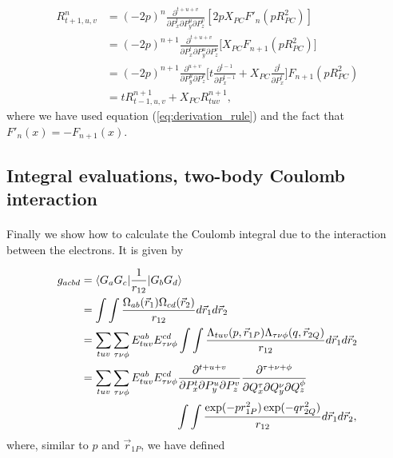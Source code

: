 \documentclass[%
twoside,                 %
final,                   %
10pt]{article}
\begin{document}
\begin{align}
 R^{n}_{t+1,u,v} & = (-2p)^n\frac{\partial^{t+u+v}}{\partial P_x^t \partial P_y^u \partial P_z^v} [2pX_{PC}F'_n(pR_{PC}^2)] \\
                 & = (-2p)^{n+1}\frac{\partial^{t+u+v}}{\partial P_x^t\partial P_y^u \partial P_z^v}\Big[X_{PC}F_{n+1}(pR_{PC}^2)\Big] \\
                 & = (-2p)^{n+1}\frac{\partial^{u+v}}{\partial P_y^u \partial P_z^v}\Big[t\frac{\partial^{t-1}}{\partial P_x^{t-1}} + X_{PC}\frac{\partial^t}{\partial P_x^t}\Big]F_{n+1}(pR_{PC}^2) \\
                 & = tR^{n+1}_{t-1,u,v} + X_{PC}R^{n+1}_{tuv},
\end{align}
where we have used equation (\ref{eq:derivation_rule}) and the fact that $F'_n(x) = -F_{n+1}(x)$.



\subsection{Integral evaluations, two-body Coulomb interaction}

\paragraph{}

Finally we show how to calculate the Coulomb integral due to the interaction between the electrons. It is given by

\begin{equation}
\begin{split}
  g_{acbd} & = \langle G_a G_c\vert \frac{1}{r_{12}}\vert G_b G_d\rangle \\
           & = \int\int \frac{\Omega_{ab}(\vec r_1)\Omega_{cd}(\vec r_2)}{r_{12}} d\vec r_1 d\vec r_2 \\
           & = \sum_{tuv}\sum_{\tau\nu\phi}E^{ab}_{tuv}E^{cd}_{\tau\nu\phi}\int\int\frac{\Lambda_{tuv}(p,\vec r_{1P})\Lambda_{\tau\nu\phi}(q,\vec r_{2Q})}{r_{12}}d \vec r_1 d\vec r_2 \\
           & = \sum_{tuv}\sum_{\tau\nu\phi}E^{ab}_{tuv}E^{cd}_{\tau\nu\phi}\frac{\partial^{t+u+v}}{\partial P_x^t \partial P_y^u \partial P_z^v}
                \frac{\partial^{\tau+\nu+\phi}}{\partial Q_x^\tau \partial Q_y^\nu \partial Q_z^\phi} \\
           &    \hspace{30mm} \int\int\frac{\exp(-pr^2_{1P})\exp(-qr^2_{2Q})}{r_{12}}d \vec r_1 d\vec r_2,
\end{split}
\end{equation}
where, similar to $p$ and $\vec r_{1P}$, we have defined
\end{document}
